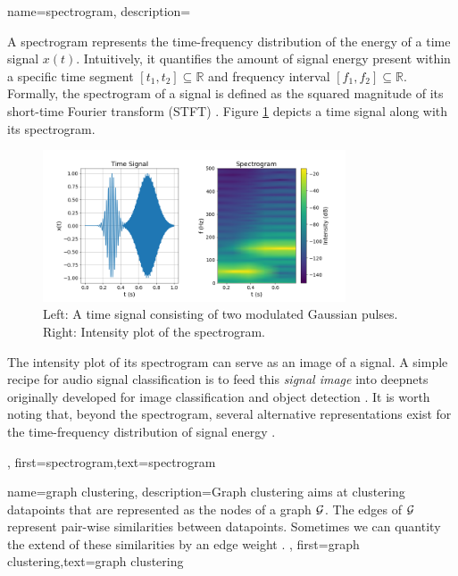 {name={spectrogram},
	description={
		A spectrogram represents the time-frequency distribution of the energy of a time signal $x(t)$.  
		Intuitively, it quantifies the amount of signal energy present within a specific time segment 
		$[t_{1},t_{2}] \subseteq \mathbb{R}$ and frequency interval $[f_{1},f_{2}]\subseteq \mathbb{R}$. 
		Formally, the spectrogram of a signal is defined as the squared magnitude of its 
		short-time Fourier transform (STFT) \cite{cohen1995time}.
        Figure \ref{fig:spectrogram_dict} depicts a time signal along with its spectrogram. 
	\begin{figure}
		\centering
		\includegraphics[width=0.8\textwidth]{assets/spectrogram.png}
		\caption{Left: A time signal consisting of two modulated Gaussian pulses. Right: Intensity 
		plot of the spectrogram.
		\label{fig:spectrogram_dict}}
	\end{figure}
        The intensity plot of its spectrogram can serve as an image of a signal. A 
		simple recipe for audio signal classification is to feed this \emph{signal image} 
		into \gls{deepnet}s originally developed for image classification and object detection \cite{Li:2022aa}. 
		It is worth noting that, beyond the spectrogram, several alternative representations exist 
		for the time-frequency distribution of signal energy \cite{TimeFrequencyAnalysisBoashash,MallatBook}. 
		}, 
	first={spectrogram},text={spectrogram} 
}

{name={graph clustering},
	description={Graph clustering aims at 
		clustering \gls{datapoint}s that are represented as the nodes 
		of a \gls{graph} $\mathcal{G}$. The edges of $\mathcal{G}$ represent 
		pair-wise similarities between \gls{datapoint}s. Sometimes we
		can quantity the extend of these similarities by an edge weight \cite{Luxburg2007,FlowSpecClustering2021}. }, 
	first={graph clustering},text={graph clustering} 
}

